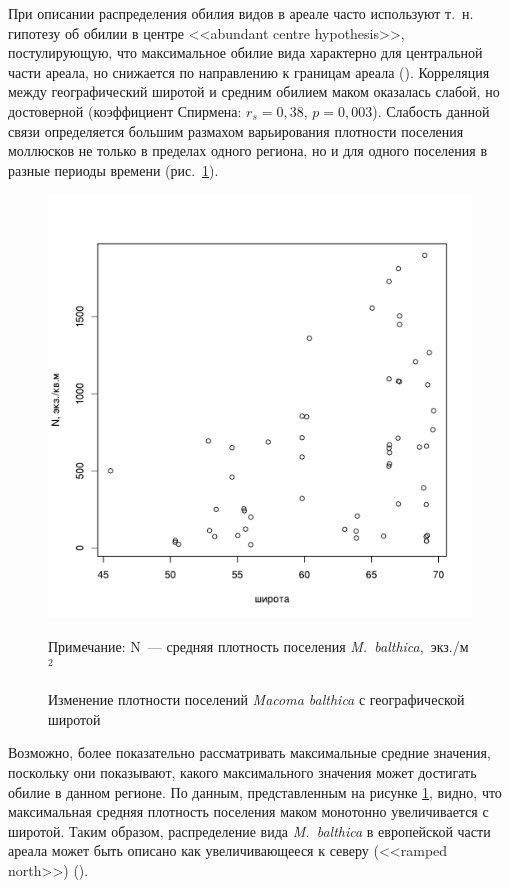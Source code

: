 При описании распределения обилия видов в ареале часто используют т.~н. гипотезу об обилии в центре <<abundant centre hypothesis>>, постулирующую, что максимальное обилие вида характерно для центральной части ареала, но снижается по направлению к границам ареала (\cite{Sagarin_et_al_2006}).
Корреляция между географический широтой и средним обилием маком оказалась слабой, но достоверной (коэффициент Спирмена: $r_{s} = 0,38$, $p = 0,003$).
Слабость данной связи определяется большим размахом варьирования плотности поселения моллюсков не только в пределах одного региона, но и для одного поселения в разные периоды времени (рис.~\ref{ris:lat_vs_Nmean}). 
	\begin{figure}[p]
    \includegraphics[width=\textwidth]{../macrodistribution/lat_vs_Nmean1.pdf}
    \caption{Изменение плотности поселений {\it Macoma balthica} с географической широтой}

{\footnotesize Примечание: N~--- средняя плотность поселения {\it M.~balthica},~экз./м$^2$}
    \label{ris:lat_vs_Nmean}
	\end{figure}
Возможно, более показательно рассматривать максимальные средние значения, поскольку они показывают, какого максимального значения может достигать обилие в данном регионе.
По данным, представленным на рисунке \ref{ris:lat_vs_Nmean}, видно, что максимальная средняя плотность поселения маком монотонно увеличивается с широтой.
Таким образом, распределение вида {\it M.~balthica} в европейской части ареала может быть описано как увеличивающееся к северу (<<ramped north>>) (\cite{Sagarin_Gaines_2002}).

